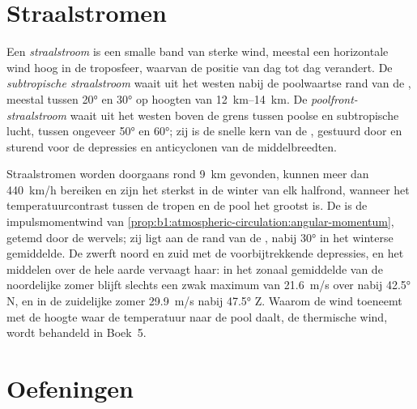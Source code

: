 \section{Straalstromen}\label{sec:b1:atmospheric-circulation:jets}

\begin{definition}\label{def:b1:atmospheric-circulation:jet}
Een \emph{straalstroom} is een smalle band van sterke wind, meestal een horizontale wind hoog in de troposfeer, waarvan de positie van dag tot dag verandert. De \emph{subtropische straalstroom} waait uit het westen nabij de poolwaartse rand van de , meestal tussen \ang{20} en \ang{30}  op hoogten van \qtyrange{12}{14}{km}. De \emph{poolfront-straalstroom} waait uit het westen boven de grens tussen poolse en subtropische lucht, tussen ongeveer \ang{50} en \ang{60}; zij is de snelle kern van de , gestuurd door en sturend voor de depressies en anticyclonen van de middelbreedten.
\end{definition}

Straalstromen worden doorgaans rond \qty{9}{km} gevonden, kunnen meer dan \qty{440}{km/h} bereiken en zijn het sterkst in de winter van elk halfrond, wanneer het temperatuurcontrast tussen de tropen en de pool het grootst is. De  is de impulsmomentwind van
\cref{prop:b1:atmospheric-circulation:angular-momentum}, getemd door de wervels; zij ligt aan de rand van de , nabij \ang{30} in het winterse gemiddelde. De  zwerft noord en zuid met de voorbijtrekkende depressies, en het middelen over de hele aarde vervaagt haar: in het zonaal gemiddelde van de noordelijke zomer blijft slechts een zwak maximum van \qty{21.6}{m/s} over nabij \ang{42.5} N, en in de zuidelijke zomer \qty{29.9}{m/s} nabij \ang{47.5} Z. Waarom de wind toeneemt met de hoogte waar de temperatuur naar de pool daalt, de thermische wind, wordt behandeld in Boek~5.

\section{Oefeningen}


